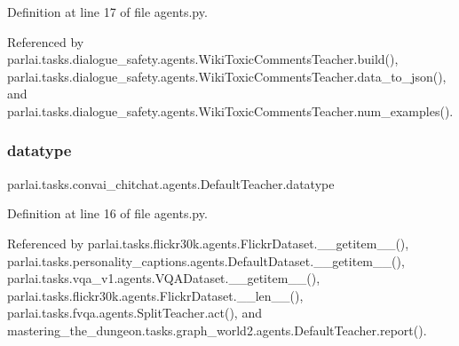 Definition at line 17 of file agents.\+py.



Referenced by parlai.\+tasks.\+dialogue\+\_\+safety.\+agents.\+Wiki\+Toxic\+Comments\+Teacher.\+build(), parlai.\+tasks.\+dialogue\+\_\+safety.\+agents.\+Wiki\+Toxic\+Comments\+Teacher.\+data\+\_\+to\+\_\+json(), and parlai.\+tasks.\+dialogue\+\_\+safety.\+agents.\+Wiki\+Toxic\+Comments\+Teacher.\+num\+\_\+examples().

\mbox{\label{classparlai_1_1tasks_1_1convai__chitchat_1_1agents_1_1DefaultTeacher_a9f90247eb9b5fead9e02ef7e50cc8f37}} 
\subsubsection{\texorpdfstring{datatype}{datatype}}
{\footnotesize\ttfamily parlai.\+tasks.\+convai\+\_\+chitchat.\+agents.\+Default\+Teacher.\+datatype}



Definition at line 16 of file agents.\+py.



Referenced by parlai.\+tasks.\+flickr30k.\+agents.\+Flickr\+Dataset.\+\_\+\+\_\+getitem\+\_\+\+\_\+(), parlai.\+tasks.\+personality\+\_\+captions.\+agents.\+Default\+Dataset.\+\_\+\+\_\+getitem\+\_\+\+\_\+(), parlai.\+tasks.\+vqa\+\_\+v1.\+agents.\+V\+Q\+A\+Dataset.\+\_\+\+\_\+getitem\+\_\+\+\_\+(), parlai.\+tasks.\+flickr30k.\+agents.\+Flickr\+Dataset.\+\_\+\+\_\+len\+\_\+\+\_\+(), parlai.\+tasks.\+fvqa.\+agents.\+Split\+Teacher.\+act(), and mastering\+\_\+the\+\_\+dungeon.\+tasks.\+graph\+\_\+world2.\+agents.\+Default\+Teacher.\+report().

\mbox{\label{classparlai_1_1tasks_1_1convai__chitchat_1_1agents_1_1DefaultTeacher_acb9a1323c173edc4c95653fcb013fd8e}} 
